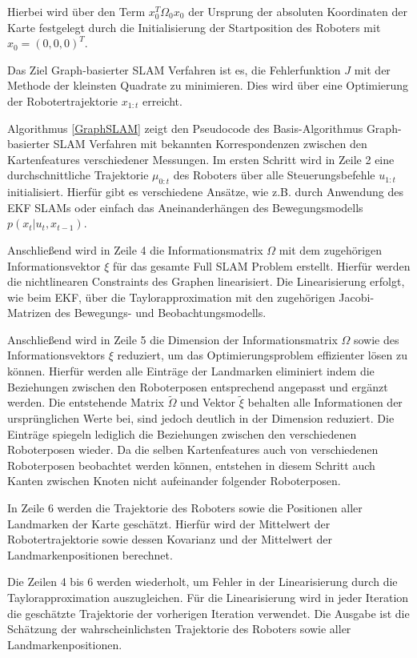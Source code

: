Hierbei wird über den Term $ x_0^T\Omega_0x_0 $ der Ursprung der absoluten Koordinaten der Karte festgelegt durch die Initialisierung der Startposition des Roboters mit $ x_0 = (0,0,0)^T $. 

Das Ziel Graph-basierter SLAM Verfahren ist es, die Fehlerfunktion $ J $ mit der Methode der kleinsten Quadrate zu minimieren. Dies wird über eine Optimierung der Robotertrajektorie $ x_{1:t} $ erreicht. 

Algorithmus \ref{GraphSLAM} zeigt den Pseudocode des Basis-Algorithmus Graph-basierter SLAM Verfahren mit bekannten Korrespondenzen zwischen den Kartenfeatures verschiedener Messungen. Im ersten Schritt wird in Zeile 2 eine durchschnittliche Trajektorie $ \mu_{0:t} $ des Roboters über alle Steuerungsbefehle $ u_{1:t} $ initialisiert. Hierfür gibt es verschiedene Ansätze, wie z.B. durch Anwendung des EKF SLAMs oder einfach das Aneinanderhängen des Bewegungsmodells $ p(x_t \vert u_t,x_{t-1}) $.

Anschließend wird in Zeile 4 die Informationsmatrix $ \Omega $ mit dem zugehörigen Informationsvektor $ \xi $ für das gesamte Full SLAM Problem erstellt. Hierfür werden die nichtlinearen Constraints des Graphen linearisiert. Die Linearisierung erfolgt, wie beim EKF, über die Taylorapproximation mit den zugehörigen Jacobi-Matrizen des Bewegungs- und Beobachtungsmodells. 

Anschließend wird in Zeile 5 die Dimension der Informationsmatrix $ \Omega $ sowie des Informationsvektors $ \xi $ reduziert, um das Optimierungsproblem effizienter lösen zu können. Hierfür werden alle Einträge der Landmarken eliminiert indem die Beziehungen zwischen den Roboterposen entsprechend angepasst und ergänzt werden. Die entstehende Matrix $ \tilde{\Omega} $ und Vektor $ \tilde{\xi} $ behalten alle Informationen der ursprünglichen Werte bei, sind jedoch deutlich in der Dimension reduziert. Die Einträge spiegeln lediglich die Beziehungen zwischen den verschiedenen Roboterposen wieder. Da
die selben Kartenfeatures auch von verschiedenen Roboterposen beobachtet werden können, entstehen in diesem Schritt auch Kanten zwischen Knoten nicht aufeinander folgender Roboterposen. 

In Zeile 6 werden die Trajektorie des Roboters sowie die Positionen aller Landmarken der Karte geschätzt. Hierfür wird der Mittelwert der Robotertrajektorie sowie dessen Kovarianz und der Mittelwert der Landmarkenpositionen berechnet. 

Die Zeilen 4 bis 6 werden wiederholt, um Fehler in der Linearisierung durch die Taylorapproximation auszugleichen. Für die Linearisierung wird in jeder Iteration die geschätzte Trajektorie der vorherigen Iteration verwendet. Die Ausgabe ist die Schätzung der wahrscheinlichsten Trajektorie des Roboters sowie aller Landmarkenpositionen. 

